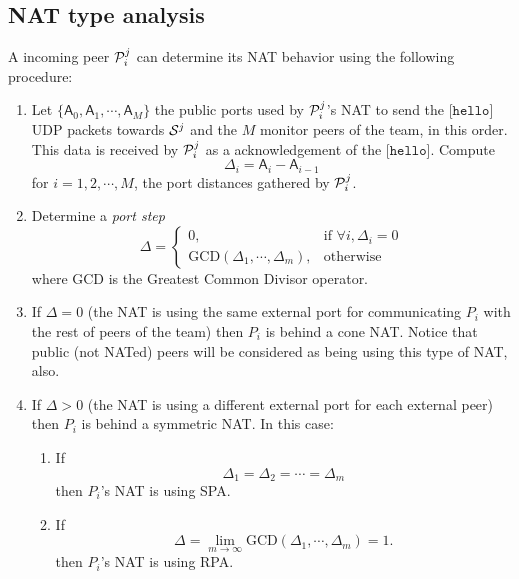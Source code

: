 \subsection{NAT type analysis}
A incoming peer ${\cal P}^j_i$ can determine its NAT behavior using
the following procedure:
\begin{enumerate}
\item Let $\{\mathsf{A}_0, \mathsf{A}_1, \cdots, \mathsf{A}_M\}$ the
  public ports used by ${\cal P}^j_i$'s NAT to send the
  [$\mathtt{hello}$] UDP packets towards ${\cal S}^j$ and the $M$
  monitor peers of the team, in this order. This data is received by
  ${\cal P}^j_i$ as a acknowledgement of the
  [$\mathtt{hello}$]. Compute
  \begin{equation}
    \Delta_i = \mathsf{A}_i - \mathsf{A}_{i-1}
    \label{eq:port_distancies}
  \end{equation}
  for $i=1,2,\cdots,M$, the port distances gathered by ${\cal P}^j_i$.
\item Determine a \emph{port step}
  \begin{equation}
    \Delta = \left\{\begin{array}{lr}
    0, & \text{if } \forall i, \Delta_i = 0 \\
    \mathrm{GCD}(\Delta_1, \cdots, \Delta_m), & \text{otherwise}
    \end{array}\right.
    \label{eq:port_step}
  \end{equation}
  where GCD is the Greatest Common Divisor operator.
\item If $\Delta=0$ (the NAT is using the same external port for
  communicating $P_i$ with the rest of peers of the team) then $P_i$
  is behind a cone NAT. Notice that public (not NATed) peers will be
  considered as being using this type of NAT, also.
\item If $\Delta>0$ (the NAT is using a different external port for
  each external peer) then $P_i$ is behind a symmetric NAT. In this
  case:
  \begin{enumerate}
  \item If
    \begin{equation}
      \Delta_1 = \Delta_2 = \cdots = \Delta_m
    \end{equation}
    then $P_i$'s NAT is using SPA.
  \item If
    \begin{equation}
      \Delta = \lim_{m\to\infty} \mathrm{GCD}(\Delta_1, \cdots, \Delta_m) = 1.
    \end{equation}
    then $P_i$'s NAT is using RPA.
  \end{enumerate}
\end{enumerate}

